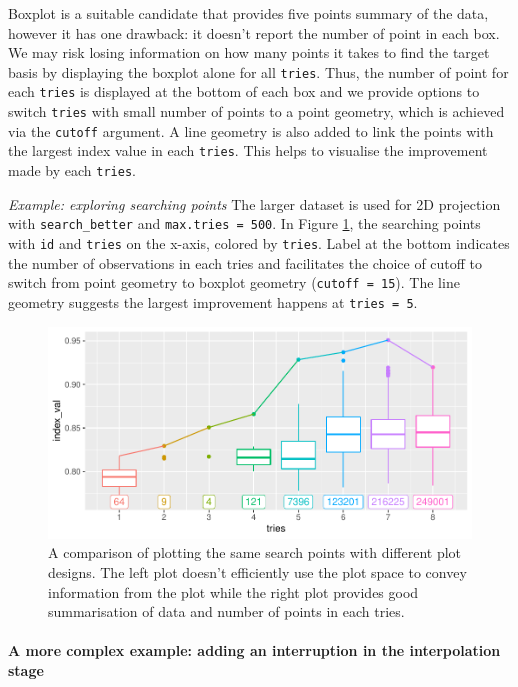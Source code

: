 \documentclass[12pt]{article}
\begin{document}
Boxplot is a suitable candidate that provides five points summary of the
data, however it has one drawback: it doesn't report the number of point
in each box. We may risk losing information on how many points it takes
to find the target basis by displaying the boxplot alone for all
\texttt{tries}. Thus, the number of point for each \texttt{tries} is
displayed at the bottom of each box and we provide options to switch
\texttt{tries} with small number of points to a point geometry, which is
achieved via the \texttt{cutoff} argument. A line geometry is also added
to link the points with the largest index value in each \texttt{tries}.
This helps to visualise the improvement made by each \texttt{tries}.

\emph{Example: exploring searching points} The larger dataset is used
for 2D projection with \texttt{search\_better} and
\texttt{max.tries\ =\ 500}. In Figure \ref{points}, the searching points
with \texttt{id} and \texttt{tries} on the x-axis, colored by
\texttt{tries}. Label at the bottom indicates the number of observations
in each tries and facilitates the choice of cutoff to switch from point
geometry to boxplot geometry (\texttt{cutoff\ =\ 15}). The line geometry
suggests the largest improvement happens at \texttt{tries\ =\ 5}.

\begin{figure}
\centering
\includegraphics{paper_files/figure-latex/points-tries-1.pdf}
\caption{\label{points}A comparison of plotting the same search points
with different plot designs. The left plot doesn't efficiently use the
plot space to convey information from the plot while the right plot
provides good summarisation of data and number of points in each tries.}
\end{figure}

\hypertarget{a-more-complex-example-adding-an-interruption-in-the-interpolation-stage}{%
\paragraph{A more complex example: adding an interruption in the
interpolation
stage}\label{a-more-complex-example-adding-an-interruption-in-the-interpolation-stage}}
\end{document}
